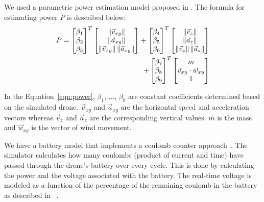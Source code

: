 {We used a parametric power estimation model proposed in \cite{3DR-energy-model}. The formula for estimating power $P$ is described below:%
\begin{equation}
\begin{aligned}
P = \begin{bmatrix}
		\beta_{1} \\
		\beta_{2} \\
		\beta_{3}
	\end{bmatrix}^{T}
    \begin{bmatrix}
		\norm{\vec{v}_{xy}} \\
		\norm{\vec{a}_{xy}} \\
		\norm{\vec{v}_{xy}}\norm{\vec{a}_{xy}}
	\end{bmatrix}
    +
    \begin{bmatrix}
		\beta_{4} \\
		\beta_{5} \\
		\beta_{6}
	\end{bmatrix}^{T}
    \begin{bmatrix}
		\norm{\vec{v}_{z}} \\
		\norm{\vec{a}_{z}} \\
		\norm{\vec{v}_{z}}\norm{\vec{a}_{z}}
	\end{bmatrix}
    \\
    +
    \begin{bmatrix}
		\beta_{7} \\
		\beta_{8} \\
		\beta_{9}
	\end{bmatrix}^{T}
    \begin{bmatrix}
		m \\
		\vec{v}_{xy} \cdot \vec{w}_{xy} \\
		1
	\end{bmatrix}
\end{aligned}
\label{eqn:power}
\end{equation}

In the Equation~\ref{eqn:power}, $\beta_{1}$, ..., $\beta_{9}$ are constant coefficients determined based on the simulated drone. $\vec{v}_{xy}$ and $\vec{a}_{xy}$ are the horizontal speed and acceleration vectors whereas  $\vec{v}_{z}$ and $\vec{a}_{z}$ are the corresponding vertical values. $m$ is the mass and $\vec{w}_{xy}$  is the vector of wind movement. 

We have a battery model that implements a coulomb counter approach~\cite{coulomb-counter}. The simulator calculates how many coulombs (product of current and time) have passed  through the drone's battery over every cycle. This is done by calculating the power and the voltage associated with the battery. The real-time voltage is modeled as a function of the percentage of the remaining coulomb in the battery as described in ~\cite{battery-model}.

}
